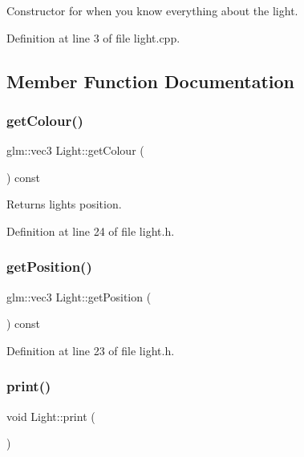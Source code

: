 Constructor for when you know everything about the light. 



Definition at line 3 of file light.\+cpp.



\subsection{Member Function Documentation}
\mbox{\label{class_light_ad00d8f1eba15a5d25b034f64e5bb4c43}} 
\subsubsection{\texorpdfstring{get\+Colour()}{getColour()}}
{\footnotesize\ttfamily glm\+::vec3 Light\+::get\+Colour (\begin{DoxyParamCaption}{ }\end{DoxyParamCaption}) const\hspace{0.3cm}{\ttfamily [inline]}}



Returns light\textquotesingle{}s position. 



Definition at line 24 of file light.\+h.

\mbox{\label{class_light_a24d3c226daf99f57427a0cb4b75605a7}} 
\subsubsection{\texorpdfstring{get\+Position()}{getPosition()}}
{\footnotesize\ttfamily glm\+::vec3 Light\+::get\+Position (\begin{DoxyParamCaption}{ }\end{DoxyParamCaption}) const\hspace{0.3cm}{\ttfamily [inline]}}



Definition at line 23 of file light.\+h.

\mbox{\label{class_light_a99d3d45283ee007ffc8b19c0d7d27077}} 
\subsubsection{\texorpdfstring{print()}{print()}}
{\footnotesize\ttfamily void Light\+::print (\begin{DoxyParamCaption}{ }\end{DoxyParamCaption})}



